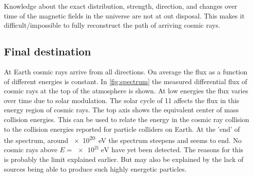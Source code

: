 Knowledge about the exact distribution, strength, direction, and changes over time of the magnetic fields in the universe are not at out disposal. This makes it difficult/impossible to fully reconstruct the path of arriving cosmic rays.


\subsection{Final destination}

At Earth cosmic rays arrive from all directions. On average the flux as a function of different energies is constant. In \cref{fig:spectrum} the measured differential flux of cosmic rays at the top of the atmosphere is shown. At low energies the flux varies over time due to solar modulation. The solar cycle of \SI{11}{\year} affects the flux in this energy region of cosmic rays. The top axis shows the equivalent center of mass collision energies. This can be used to relate the energy in the cosmic ray collision to the collision energies reported for particle colliders on Earth. At the 'end' of the spectrum, around \SI{e20}{\eV} the spectrum steepens and seems to end. No cosmic rays above $E = \SI{e21}{\eV}$ have yet been detected. The reasons for this is probably the \gzk limit explained earlier. But may also be explained by the lack of sources being able to produce such highly energetic particles.

